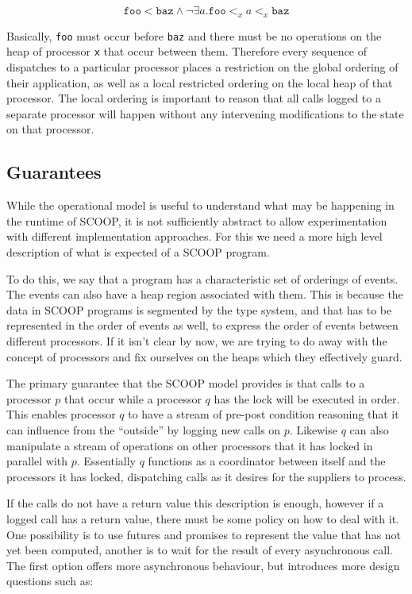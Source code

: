 \documentclass[a4]{article}
\begin{document}
\[
\mathtt{foo} < \mathtt{baz} \wedge
\neg \exists a . \mathtt{foo} <_x a <_x \mathtt{baz}
\]

Basically, \texttt{foo} must occur before \texttt{baz} and
there must be no operations on the heap of processor \texttt{x}
that occur between them.
Therefore every sequence of dispatches to a particular processor
places a restriction on the global ordering of their application,
as well as a local restricted ordering on the local heap of that processor.
The local ordering is important to reason that all calls logged
to a separate processor will happen without any
intervening modifications to the state on that processor.

\subsection{Guarantees}
While the operational model is useful to understand what may be happening
in the runtime of SCOOP,
it is not sufficiently abstract to allow experimentation
with different implementation approaches.
For this we need a more high level description of what is expected
of a SCOOP program.

To do this, we say that a program has a characteristic set of
orderings of events.
The events can also have a heap region associated with them.
This is because the data in SCOOP programs is segmented by the type system,
and that has to be represented in the order of events as well,
to express the order of events between different processors.
If it isn't clear by now, we are trying to do away with the concept
of processors and fix ourselves on the heaps which they effectively guard.

The primary guarantee that the SCOOP model provides is that calls to a
processor $p$ that occur while a processor $q$ has the lock
will be executed in order.
This enables processor $q$ to have
a stream of pre-post condition reasoning that
it can influence from the ``outside'' by logging new calls on $p$.
Likewise $q$ can also manipulate a stream of operations on other
processors that it has locked in parallel with $p$.
Essentially $q$ functions as a coordinator between itself
and the processors it has locked,
dispatching calls as it desires for the suppliers to process.

If the calls do not have a return value this description is enough,
however if a logged call has a return value,
there must be some policy on how to deal with it.
One possibility is to use futures and promises to represent the value that has
not yet been computed,
another is to wait for the result of every asynchronous call.
The first option offers more asynchronous behaviour,
but introduces more design questions such as:
\end{document}
